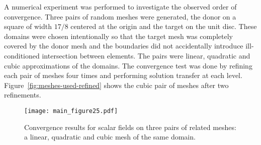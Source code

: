 \documentclass[oneside, reqno]{amsart}
\theoremstyle{definition}
\begin{document}
A numerical experiment was performed to investigate the observed order
of convergence. Three pairs of random meshes were generated, the donor
on a square of width \(17 / 8\) centered at the origin
and the target on the unit disc. These domains were chosen intentionally so
that the target mesh was completely covered by the donor mesh and the
boundaries did not accidentally introduce ill-conditioned intersection between
elements. The pairs were linear, quadratic and
cubic approximations of the domains. The convergence test was done by
refining each pair of meshes four times and performing solution transfer
at each level. Figure~\ref{fig:meshes-used-refined} shows the cubic
pair of meshes after two refinements.

\begin{figure}
  \texttt{[image: main\_figure25.pdf]}
  \centering
  \captionsetup{width=.75\linewidth}
  \caption{Convergence results for scalar fields on three pairs of related
    meshes: a linear, quadratic and cubic mesh of the same domain.}
  \label{fig:composite-errors}
\end{figure}
\end{document}
